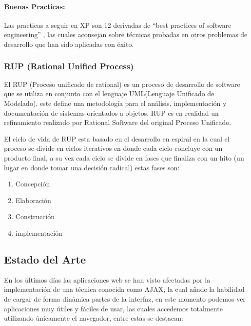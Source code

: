 \paragraph{Buenas Practicas:} Las practicas a seguir en XP son 12 \cite{xp_practices} derivadas de ``best practices of software engineering'' \cite{best_practices}, las cuales aconsejan sobre técnicas probadas en otros problemas de desarrollo que han sido aplicadas con éxito.


\subsubsection*{RUP (Rational Unified Process) \cite{rup}}

El RUP (Proceso unificado de rational) es un proceso de desarrollo de software que se utiliza en conjunto con el lenguaje UML(Lenguaje Unificado de Modelado), este define una metodología para el análisis, implementación y documentación de sistemas orientados a objetos. RUP es en realidad un refinamiento realizado por Rational Software del original Proceso Unificado.

El ciclo de vida de RUP esta basado en el desarrollo en espiral en la cual el proceso se divide en ciclos iterativos en donde cada ciclo concluye con un producto final, a su vez cada ciclo se divide en fases que finaliza con un hito (un lugar en donde tomar una decisión radical) estas fases son: 

\begin{enumerate}

	\item Concepción
	\item Elaboración
	\item Construcción
	\item implementación

\end{enumerate}


\subsection{Estado del Arte}

En los últimos días las aplicaciones web se han visto afectadas por la implementación de una técnica conocida como AJAX, la cual añade la habilidad de cargar de forma dinámica partes de la interfaz, en este momento podemos ver aplicaciones muy útiles y fáciles de usar, las cuales accedemos totalmente utilizando únicamente el navegador, entre estas se destacan:


